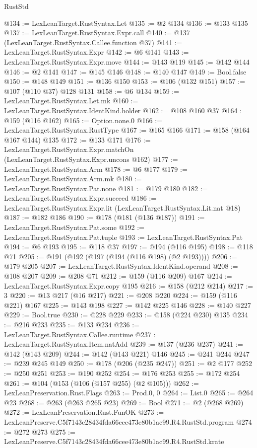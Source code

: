 \begin{lexlean}{RustStd}
\begin{coremodule}
@134 := LexLeanTarget.RustSyntax.Let
@135 := @2 @134
@136 := @133 @135
@137 := LexLeanTarget.RustSyntax.Expr.call
@140 := @137 (LexLeanTarget.RustSyntax.Callee.function @37)
@141 := LexLeanTarget.RustSyntax.Expr
@142 := @6 @141
@143 := LexLeanTarget.RustSyntax.Expr.move
@144 := @143 @119
@145 := @142 @144
@146 := @2 @141
@147 := @145 @146
@148 := @140 @147
@149 := Bool.false
@150 := @148 @149
@151 := @136 @150
@153 := @106 (@132 @151)
@157 := @107 (@110 @37) @128 @131
@158 := @6 @134
@159 := LexLeanTarget.RustSyntax.Let.mk
@160 := LexLeanTarget.RustSyntax.IdentKind.holder
@162 := @108 @160 @37
@164 := @159 (@116 @162)
@165 := Option.none.{0}
@166 := LexLeanTarget.RustSyntax.RustType
@167 := @165 @166
@171 := @158 (@164 @167 @144) @135
@172 := @133 @171
@176 := LexLeanTarget.RustSyntax.Expr.matchOn (LexLeanTarget.RustSyntax.Expr.uncons @162)
@177 := LexLeanTarget.RustSyntax.Arm
@178 := @6 @177
@179 := LexLeanTarget.RustSyntax.Arm.mk
@180 := LexLeanTarget.RustSyntax.Pat.none
@181 := @179 @180
@182 := LexLeanTarget.RustSyntax.Expr.succeed
@186 := LexLeanTarget.RustSyntax.Expr.lit (LexLeanTarget.RustSyntax.Lit.nat @18)
@187 := @182 @186
@190 := @178 (@181 (@136 @187))
@191 := LexLeanTarget.RustSyntax.Pat.some
@192 := LexLeanTarget.RustSyntax.Pat.tuple
@193 := LexLeanTarget.RustSyntax.Pat
@194 := @6 @193
@195 := @118 @37
@197 := @194 (@116 @195)
@198 := @118 @71
@205 := @191 (@192 (@197 (@194 (@116 @198) (@2 @193))))
@206 := @179 @205
@207 := LexLeanTarget.RustSyntax.IdentKind.operand
@208 := @108 @207
@209 := @208 @71
@212 := @159 (@116 @209) @167
@214 := LexLeanTarget.RustSyntax.Expr.copy @195
@216 := @158 (@212 @214)
@217 := 3
@220 := @13 @217 (@16 @217)
@221 := @208 @220
@224 := @159 (@116 @221) @167
@225 := @143 @198
@227 := @142 @225 @146
@228 := @140 @227
@229 := Bool.true
@230 := @228 @229
@233 := @158 (@224 @230) @135
@234 := @216 @233
@235 := @133 @234
@236 := LexLeanTarget.RustSyntax.Callee.runtime
@237 := LexLeanTarget.RustSyntax.Item.natAdd
@239 := @137 (@236 @237)
@241 := @142 (@143 @209)
@244 := @142 (@143 @221) @146
@245 := @241 @244
@247 := @239 @245 @149
@250 := @178 (@206 (@235 @247))
@251 := @2 @177
@252 := @250 @251
@253 := @190 @252
@254 := @176 @253
@255 := @172 @254
@261 := @104 (@153 (@106 (@157 @255) (@2 @105)))
@262 := LexLeanPreservation.Rust.Flags
@263 := Prod.{0, 0}
@264 := List.{0}
@265 := @264 @23
@268 := @263 (@263 @265 @23)
@269 := Bool
@271 := @2 (@268 @269)
@272 := LexLeanPreservation.Rust.FunOK
@273 := LexLeanPreserve.C5f7143c28434fda66cee473e80b1ac99.R4.RustStd.program
@274 := @272 @273
@275 := LexLeanPreserve.C5f7143c28434fda66cee473e80b1ac99.R4.RustStd.krate

\end{coremodule}
\end{lexlean}
